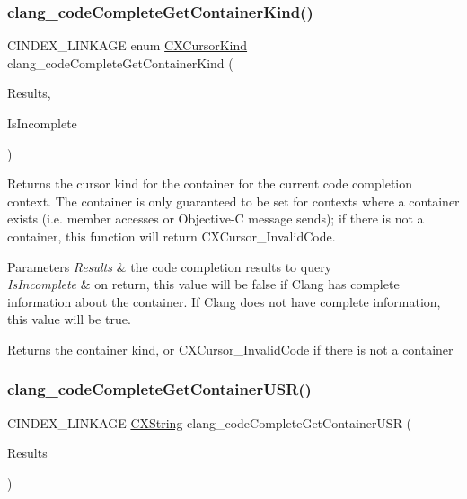 \subsubsection{\texorpdfstring{clang\+\_\+code\+Complete\+Get\+Container\+Kind()}{clang\_codeCompleteGetContainerKind()}}
{\footnotesize\ttfamily C\+I\+N\+D\+E\+X\+\_\+\+L\+I\+N\+K\+A\+GE enum \mbox{\hyperlink{group__CINDEX_gaaccc432245b4cd9f2d470913f9ef0013}{C\+X\+Cursor\+Kind}} clang\+\_\+code\+Complete\+Get\+Container\+Kind (\begin{DoxyParamCaption}\item[{\mbox{\hyperlink{structCXCodeCompleteResults}{C\+X\+Code\+Complete\+Results}} $\ast$}]{Results,  }\item[{unsigned $\ast$}]{Is\+Incomplete }\end{DoxyParamCaption})}



Returns the cursor kind for the container for the current code completion context. The container is only guaranteed to be set for contexts where a container exists (i.\+e. member accesses or Objective-\/C message sends); if there is not a container, this function will return C\+X\+Cursor\+\_\+\+Invalid\+Code. 


\begin{DoxyParams}{Parameters}
{\em Results} & the code completion results to query\\
\hline
{\em Is\+Incomplete} & on return, this value will be false if Clang has complete information about the container. If Clang does not have complete information, this value will be true.\\
\hline
\end{DoxyParams}
\begin{DoxyReturn}{Returns}
the container kind, or C\+X\+Cursor\+\_\+\+Invalid\+Code if there is not a container 
\end{DoxyReturn}
\mbox{\label{group__CINDEX__CODE__COMPLET_gaf45d7f61268af6ec88c70a6fc69d5818}} 
\subsubsection{\texorpdfstring{clang\+\_\+code\+Complete\+Get\+Container\+U\+S\+R()}{clang\_codeCompleteGetContainerUSR()}}
{\footnotesize\ttfamily C\+I\+N\+D\+E\+X\+\_\+\+L\+I\+N\+K\+A\+GE \mbox{\hyperlink{structCXString}{C\+X\+String}} clang\+\_\+code\+Complete\+Get\+Container\+U\+SR (\begin{DoxyParamCaption}\item[{\mbox{\hyperlink{structCXCodeCompleteResults}{C\+X\+Code\+Complete\+Results}} $\ast$}]{Results }\end{DoxyParamCaption})}



